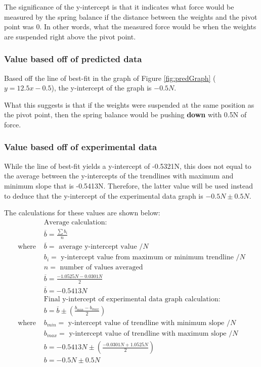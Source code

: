 \documentclass[letterpaper, 12pt]{article}
\begin{document}
The significance of the y-intercept is that it indicates what force would
be measured by the spring balance if the distance between the weights and
the pivot point was 0. In other words, what the measured force would be when
the weights are suspended right above the pivot point.

\subsubsection{Value based off of predicted data}

Based off the line of best-fit in the graph of Figure \ref*{fig:predGraph}
($y = 12.5x - 0.5$), the y-intercept of the graph is $-0.5\unit{N}$.

What this suggests is that if the weights were suspended at the same
position as the pivot point, then the spring balance would be pushing
\textbf{down} with 0.5\unit{N} of force.

\subsubsection{Value based off of experimental data}

While the line of best-fit yields a y-intercept of -0.5321\unit{N},
this does not equal to the average between the y-intercepts of the
trendlines with maximum and minimum slope that is -0.5413\unit{N}. Therefore,
the latter value will be used instead to deduce that the y-intercept of
the experimental data graph is $-0.5\unit{N} \pm 0.5\unit{N}$.

The calculations for these values are shown below:
\begin{align*}
                  & \text{Average calculation:}
    \\
                  & \overline{b} = \frac{\sum b_i}{n}
    \\
    \text{where } & \overline{b} = \text{ average y-intercept value } /\unit{N}
    \\ & b_i = \text{ y-intercept value from maximum or minimum trendline } /\unit{N}
    \\ & n = \text{ number of values averaged }
    \\
                  & \overline{b} = \frac{-1.0525\unit{N} - 0.0301\unit{N}}{2}
    \\
                  & \overline{b} = -0.5413\unit{N}
    \\
                  & \text{Final y-intercept of experimental data graph calculation:}
    \\
                  & b = \overline{b} \pm \left(\frac{b_{min} - b_{max}}{2}\right)
    \\
    \text{where } & b_{min} = \text{ y-intercept value of trendline with minimum slope } /\unit{N}
    \\ & b_{max} = \text{ y-intercept value of trendline with maximum slope } /\unit{N}
    \\
                  & b = -0.5413\unit{N} \pm \left(\frac{-0.0301\unit{N} + 1.0525\unit{N}}{2}\right)
    \\
                  & b = -0.5\unit{N} \pm 0.5\unit{N}
\end{align*}
\end{document}
